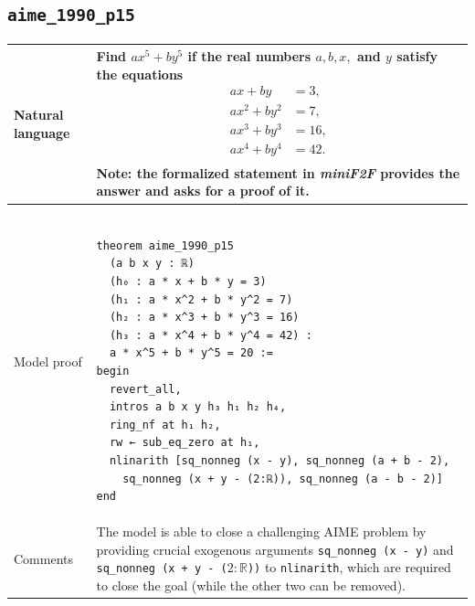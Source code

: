 \documentclass[nohyperref]{article}
\theoremstyle{plain}
\theoremstyle{definition}
\theoremstyle{remark}
\begin{document}
\subsection*{\texttt{aime\_1990\_p15}} \label{exprob4}
\begin{table}[h]
\begin{small}
\begin{tabular}{|p{3.5cm}|p{12.5cm}|} 
  \hline 
  Natural language & 
  \begin{minipage}{12.5 cm}
    \vspace{0.5em} 
    Find $ax^5 + by^5$ if the real numbers $a,b,x,$ and $y$ satisfy the equations
    {\begin{align*}
      ax + by &= 3, \\
      ax^2 + by^2 &= 7, \\
      ax^3 + by^3 &= 16, \\
      ax^4 + by^4 &= 42. \\
    \end{align*}}
    \textbf{Note}: the formalized statement in \textit{miniF2F} provides the answer and asks for a proof of it.
  \end{minipage} \\
  \hline 
  \centering Model proof & 
  \begin{minipage}{12.5 cm}
    \begin{verbatim} 
  
theorem aime_1990_p15
  (a b x y : ℝ)
  (h₀ : a * x + b * y = 3)
  (h₁ : a * x^2 + b * y^2 = 7)
  (h₂ : a * x^3 + b * y^3 = 16)
  (h₃ : a * x^4 + b * y^4 = 42) :
  a * x^5 + b * y^5 = 20 :=
begin
  revert_all,
  intros a b x y h₃ h₁ h₂ h₄,
  ring_nf at h₁ h₂,
  rw ← sub_eq_zero at h₁,
  nlinarith [sq_nonneg (x - y), sq_nonneg (a + b - 2),
    sq_nonneg (x + y - (2:ℝ)), sq_nonneg (a - b - 2)]
end
    \end{verbatim} 
  \end{minipage}\\
  \hline 
  \centering Comments & The model is able to close a challenging AIME problem by providing crucial exogenous arguments \texttt{sq\_nonneg (x - y)} and \texttt{sq\_nonneg (x + y - ($2 : \mathbb{R}$))} to \texttt{nlinarith}, which are required to close the goal (while the other two can be removed).  \\
  \hline
\end{tabular}
\end{small}
\end{table}

\newpage
\end{document}
